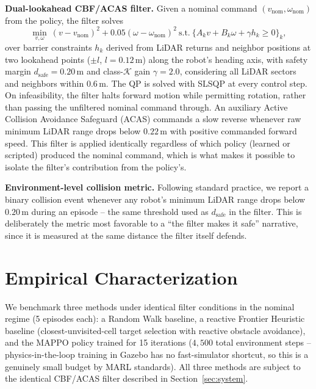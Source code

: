 \documentclass[12pt]{article}
\newcommand{\si}[1]{\mathrm{#1}}
\begin{document}
\textbf{Dual-lookahead CBF/ACAS filter.} Given a nominal command
$(v_{\text{nom}}, \omega_{\text{nom}})$ from the policy, the filter solves
\begin{equation}
\min_{v,\omega}\ (v-v_{\text{nom}})^2 + 0.05(\omega-\omega_{\text{nom}})^2
\ \text{s.t.}\ \{A_k v + B_k\omega + \gamma h_k \ge 0\}_k,
\end{equation}
over barrier constraints $h_k$ derived from LiDAR returns and neighbor
positions at two lookahead points ($\pm l$, $l=0.12\,\si{m}$) along the
robot's heading axis, with safety margin $d_{\text{safe}}=0.20\,\si{m}$ and
class-$\mathcal{K}$ gain $\gamma=2.0$, considering all LiDAR sectors and
neighbors within $0.6\,\si{m}$. The QP is solved with SLSQP at every control
step. On infeasibility, the filter halts forward motion while permitting
rotation, rather than passing the unfiltered nominal command through. An
auxiliary Active Collision Avoidance Safeguard (ACAS) commands a slow reverse
whenever raw minimum LiDAR range drops below $0.22\,\si{m}$ with positive
commanded forward speed. This filter is applied identically regardless of
which policy (learned or scripted) produced the nominal command, which is
what makes it possible to isolate the filter's contribution from the
policy's.

\textbf{Environment-level collision metric.} Following standard practice, we
report a binary collision event whenever any robot's minimum LiDAR range
drops below $0.20\,\si{m}$ during an episode -- the same threshold used as
$d_{\text{safe}}$ in the filter. This is deliberately the metric most
favorable to a ``the filter makes it safe'' narrative, since it is measured
at the same distance the filter itself defends.

\section{Empirical Characterization}
\label{sec:empirical}
We benchmark three methods under identical filter conditions in the nominal
regime (5 episodes each): a Random Walk baseline, a reactive Frontier
Heuristic baseline (closest-unvisited-cell target selection with reactive
obstacle avoidance), and the MAPPO policy trained for 15 iterations
($4{,}500$ total environment steps -- physics-in-the-loop training in Gazebo
has no fast-simulator shortcut, so this is a genuinely small budget by MARL
standards). All three methods are subject to the identical CBF/ACAS filter
described in Section~\ref{sec:system}.
\end{document}
